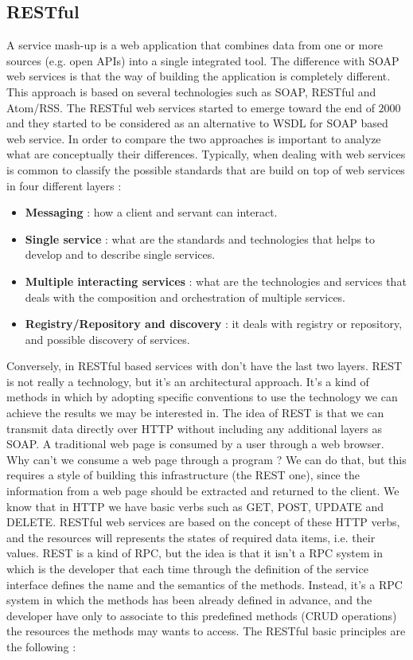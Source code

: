 \documentclass[11pt]{article}
\begin{document}
\subsection{RESTful}
A service mash-up is a web application that combines data from one or more sources (e.g. open APIs) into a single integrated tool. The difference with SOAP web services is that the way of building the application is completely different. This approach is based on several technologies such as SOAP, RESTful and Atom/RSS. The RESTful web services started to emerge toward the end of $2000$ and they started to be considered as an alternative to WSDL for SOAP based web service. In order to compare the two approaches is important to analyze what are conceptually their differences. Typically, when dealing with web services is common to classify the possible standards that are build on top of web services in four different layers :
\begin{itemize}
\item \textbf{Messaging} : how a client and servant can interact.
\item \textbf{Single service} : what are the standards and technologies that helps to develop and to describe single services.
\item \textbf{Multiple interacting services} : what are the technologies and services that deals with the composition and orchestration of multiple services. 
\item \textbf{Registry/Repository and discovery} : it deals with registry or repository, and possible discovery of services.
\end{itemize}
Conversely, in RESTful based services with don't have the last two layers. REST is not really a technology, but it's an architectural approach. It's a kind of methods in which by adopting specific conventions to use the technology we can achieve the results we may be interested in. The idea of REST is that we can transmit data directly over HTTP without including any additional layers as SOAP. A traditional web page is consumed by a user through a web browser. Why can't we consume a web page through a program ? We can do that, but this requires a style of building this infrastructure (the REST one), since the information from a web page should be extracted and returned to the client. We know that in HTTP we have basic verbs such as GET, POST, UPDATE and DELETE. RESTful web services are based on the concept of these HTTP verbs, and the resources will represents the states of required data items, i.e. their values. REST is a kind of RPC, but the idea is that it isn't a RPC system in which is the developer that each time through the definition of the service interface defines the name and the semantics of the methods. Instead, it's a RPC system in which the methods has been already defined in advance, and the developer have only to associate to this predefined methods (CRUD operations) the resources the methods may wants to access. The RESTful basic principles are the following :
\end{document}
